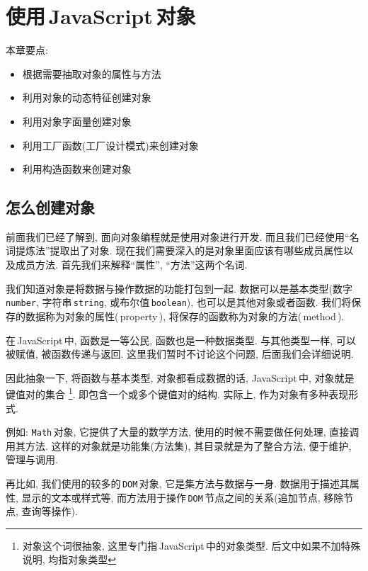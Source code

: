 
\chapter{使用\,JavaScript\,对象}

本章要点:

\begin{itemize}
\item 根据需要抽取对象的属性与方法
\item 利用对象的动态特征创建对象
\item 利用对象字面量创建对象
\item 利用工厂函数(工厂设计模式)来创建对象
\item 利用构造函数来创建对象
\end{itemize}


\section{怎么创建对象}

前面我们已经了解到, 面向对象编程就是使用对象进行开发. 而且我们已经使用``名词提炼法''提取出了对象.
现在我们需要深入的是对象里面应该有哪些成员属性以及成员方法. 首先我们来解释``属性'', ``方法''这两个名词.

我们知道对象是将数据与操作数据的功能打包到一起. 数据可以是基本类型(数字\,\lstinline|number|, 
字符串\,\lstinline|string|, 或布尔值\,\lstinline|boolean|), 也可以是其他对象或者函数. 
我们将保存的数据称为对象的属性(\,property\,), 将保存的函数称为对象的方法(\,method\,).

在\,JavaScript\,中, 函数是一等公民, 函数也是一种数据类型. 与其他类型一样, 可以被赋值, 被函数传递与返回.
这里我们暂时不讨论这个问题, 后面我们会详细说明.

因此抽象一下, 将函数与基本类型, 对象都看成数据的话, JavaScript\,中, 对象就是键值对的集合%
%
\footnote{对象这个词很抽象, 这里专门指\,JavaScript\,中的对象类型. 后文中如果不加特殊说明, 均指对象类型}. 
%
即包含一个或多个键值对的结构. 实际上, 作为对象有多种表现形式. 

例如: \lstinline|Math|\,对象, 它提供了大量的数学方法, 
使用的时候不需要做任何处理, 直接调用其方法. 这样的对象就是功能集(方法集), 
其目录就是为了整合方法, 便于维护, 管理与调用.

再比如, 我们使用的较多的\,\lstinline|DOM|\,对象, 它是集方法与数据与一身. 数据用于描述其属性, 显示的文本或样式等,
而方法用于操作\,\lstinline|DOM|\,节点之间的关系(追加节点, 移除节点, 查询等操作).

